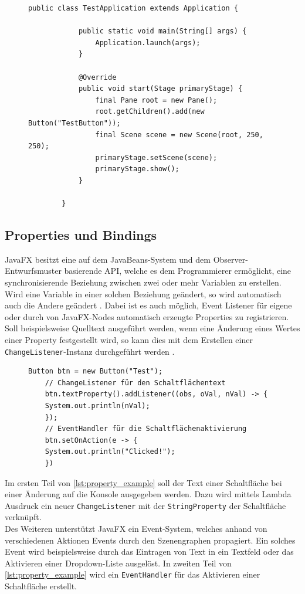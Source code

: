 \begin{figure}[H]
	\begin{lstlisting}[caption={Beispiel -- Minimale JavaFX-Anwendung.}, captionpos=b, label=lst:example_javafxapp]
		public class TestApplication extends Application {
			
			public static void main(String[] args) {
				Application.launch(args);
			}
			
			@Override
			public void start(Stage primaryStage) {
				final Pane root = new Pane();
				root.getChildren().add(new Button("TestButton"));
				final Scene scene = new Scene(root, 250, 250);
				primaryStage.setScene(scene);
				primaryStage.show();
			}
		
		}
	\end{lstlisting}
\end{figure}
\subsection{Properties und Bindings}
JavaFX besitzt eine auf dem JavaBeans-System und dem Observer-Entwurfsmuster basierende API, welche es dem Programmierer ermöglicht, eine synchronisierende Beziehung zwischen zwei oder mehr Variablen zu erstellen. Wird eine Variable in einer solchen Beziehung geändert, so wird automatisch auch die Andere geändert \cite{Hommel2013}. Dabei ist es auch möglich, Event Listener für eigene oder durch von JavaFX-Nodes automatisch erzeugte Properties zu registrieren. Soll beispielsweise Quelltext ausgeführt werden, wenn eine Änderung eines Wertes einer Property festgestellt wird, so kann dies mit dem Erstellen einer \texttt{ChangeListener}-Instanz durchgeführt werden \cite{Gao2019}. 
\begin{figure}[H]
	\begin{lstlisting}[caption=Beispiel -- ChangeListener \& EventHandler., captionpos=b, label=lst:property_example]
	Button btn = new Button("Test");
	// ChangeListener für den Schaltflächentext
	btn.textProperty().addListener((obs, oVal, nVal) -> {
	System.out.println(nVal);
	});	
	// EventHandler für die Schaltflächenaktivierung
	btn.setOnAction(e -> {
	System.out.println("Clicked!");
	})
	\end{lstlisting}
\end{figure}
\noindent Im ersten Teil von \autoref{lst:property_example} soll der Text einer Schaltfläche bei einer Änderung auf die Konsole ausgegeben werden. Dazu wird mittels Lambda Ausdruck ein neuer \texttt{ChangeListener} mit der \texttt{StringProperty} der Schaltfläche verknüpft.\\
Des Weiteren unterstützt JavaFX ein Event-System, welches anhand von verschiedenen Aktionen Events durch den Szenengraphen propagiert. Ein solches Event wird beispielsweise durch das Eintragen von Text in ein Textfeld oder das Aktivieren einer Dropdown-Liste ausgelöst. In zweiten Teil von \autoref{lst:property_example} wird ein \texttt{EventHandler} für das Aktivieren einer Schaltfläche erstellt.


